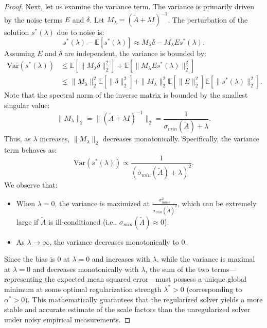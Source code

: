 \documentclass{article}
\theoremstyle{plain}
\theoremstyle{definition}
\theoremstyle{remark}
\begin{document}
\begin{proof}
Next, let us examine the variance term. The variance is primarily driven by the noise terms $E$ and $\delta$. 
Let $M_\lambda = (\tilde{A} + \lambda I)^{-1}$. 
The perturbation of the solution $s^*(\lambda)$ due to noise is:
\begin{equation}
    s^*(\lambda) - \mathbb{E}[s^*(\lambda)] \approx M_\lambda \delta - M_\lambda E s^*(\lambda).
\end{equation}
Assuming $E$ and $\delta$ are independent, the variance is bounded by:
\begin{align}
    \text{Var}(s^*(\lambda)) &\le \mathbb{E}[\|M_\lambda \delta\|_2^2] + \mathbb{E}[\|M_\lambda E s^*(\lambda)\|_2^2] \nonumber\\
    &\le \|M_\lambda\|_2^2 \mathbb{E}[\|\delta\|_2^2] + \|M_\lambda\|_2^2 \mathbb{E}[\|E\|_2^2] \mathbb{E}[\|s^*(\lambda)\|_2^2].
\end{align}
Note that the spectral norm of the inverse matrix is bounded by the smallest singular value:
\begin{equation}
    \|M_\lambda\|_2 = \|(\tilde{A} + \lambda I)^{-1}\|_2 = \frac{1}{\sigma_{min}(\tilde{A}) + \lambda}.
\end{equation}
Thus, as $\lambda$ increases, $\|M_\lambda\|_2$ decreases monotonically. 
Specifically, the variance term behaves as:
\begin{equation}
    \text{Var}(s^*(\lambda)) \propto \frac{1}{(\sigma_{min}(\tilde{A}) + \lambda)^2}.
\end{equation}
We observe that:
\begin{itemize}
    \item When $\lambda = 0$, the variance is maximized at $\frac{\sigma^2_{noise}}{\sigma_{min}(\tilde{A})^2}$, which can be extremely large if $\tilde{A}$ is ill-conditioned (i.e., $\sigma_{min}(\tilde{A}) \approx 0$).
    \item As $\lambda \to \infty$, the variance decreases monotonically to $0$.
\end{itemize}

Since the bias is $0$ at $\lambda = 0$ and increases with $\lambda$, while the variance is maximal at $\lambda = 0$ and decreases monotonically with $\lambda$, the sum of the two terms—representing the expected mean squared error—must possess a unique global minimum at some optimal regularization strength $\lambda^* > 0$ (corresponding to $\alpha^* > 0$). 
This mathematically guarantees that the regularized solver yields a more stable and accurate estimate of the scale factors than the unregularized solver under noisy empirical measurements.
\end{proof}
\end{document}
